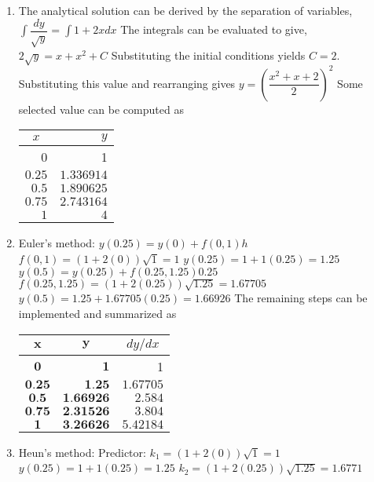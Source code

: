 \documentclass[../main.tex]{subfiles}
\begin{document}
\section{} \label{sec:sec_18_2}
\begin{enumerate}[label=\bfseries(\alph*)]
\item The analytical solution can be derived by the separation of variables,
	\bigbreak
$\displaystyle\int \dfrac{d y}{\sqrt{y}}=\int 1+2 x d x$
	\bigbreak
The integrals can be evaluated to give,
	\bigbreak
$2 \sqrt{y}=x+x^{2}+C$
	\bigbreak
Substituting the initial conditions yields $C=2$. Substituting this value and rearranging gives
	\bigbreak
$y=\left(\dfrac{x^{2}+x+2}{2}\right)^{2}$
	\bigbreak
Some selected value can be computed as
	\bigbreak
\begin{tabular}{rr}
\hline
\multicolumn{1}{c}{$x$} & $y$ \\
\hline
0 & 1 \\
$0.25$ & $1.336914$ \\
$0.5$ & $1.890625$ \\
$0.75$ & $2.743164$ \\
$1 $ & $4$\\
\hline
\end{tabular}
	\bigbreak
\item Euler's method:
	\bigbreak
$y(0.25)=y(0)+f(0,1) h$
	\bigbreak
$f(0,1)=(1+2(0)) \sqrt{1}=1$
	\bigbreak
$y(0.25)=1+1(0.25)=1.25$
	\bigbreak
$y(0.5)=y(0.25)+f(0.25,1.25) 0.25$
	\bigbreak
$f(0.25,1.25)=(1+2(0.25)) \sqrt{1.25}=1.67705$
	\bigbreak
$y(0.5)=1.25+1.67705(0.25)=1.66926$
	\bigbreak
The remaining steps can be implemented and summarized as
	\bigbreak
\begin{tabular}{crr}
\hline
$\boldsymbol{x}$ & \multicolumn{1}{c}{$\boldsymbol{y}$} & \multicolumn{1}{c}{$d y / d x$} \\
\hline
$\mathbf{0}$ & $\mathbf{1}$ & 1 \\
$\mathbf{0 . 2 5}$ & $\mathbf{1 . 2 5}$ & $1.67705$ \\
$\mathbf{0 . 5}$ & $\mathbf{1 . 6 6 9 2 6}$ & $2.584$ \\
$\mathbf{0 . 7 5}$ & $\mathbf{2 . 3 1 5 2 6}$ & $3.804$ \\
$\mathbf{1}$ & $\mathbf{3 . 2 6 6 2 6}$ & $5.42184$ \\
\hline
\end{tabular}
	\bigbreak
\item Heun's method:
	\bigbreak
Predictor:
	\bigbreak
$k_{1}=(1+2(0)) \sqrt{1}=1$
	\bigbreak
$y(0.25)=1+1(0.25)=1.25$
	\bigbreak
$k_{2}=(1+2(0.25)) \sqrt{1.25}=1.6771$

\end{enumerate}
\end{document}
